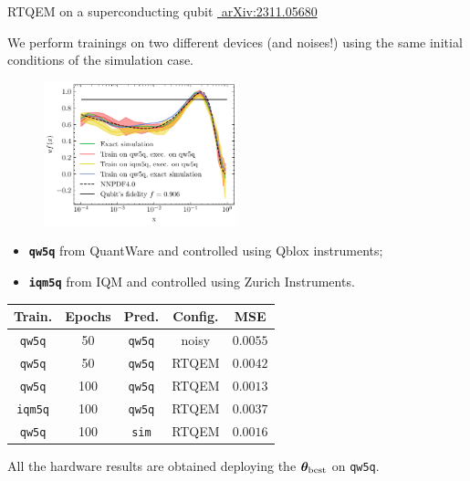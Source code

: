 \documentclass[8pt, xcolor={svgnames}, hyperref={linkcolor=black}]{beamer}
\begin{document}
\begin{frame}{RTQEM on a superconducting qubit \hfill \href{https://arxiv.org/abs/2311.05680}{\faBook\,\,arXiv:2311.05680}}

We perform trainings on two different devices (and noises!) using the same initial
conditions of the simulation case.
\pause
\begin{multicols}{2}

\begin{figure}
    \includegraphics[width=0.5\textwidth]{figures/100.pdf}%
\end{figure}
\pause
\begin{center}
\begin{itemize}[noitemsep]
  \item[\faCog] \textbf{\texttt{qw5q}} from QuantWare and controlled using Qblox instruments;
  \item[\faCog] \textbf{\texttt{iqm5q}} from IQM and controlled using Zurich Instruments.
\end{itemize}
\pause
\footnotesize
\begin{table}
\begin{tabular}{ccccc}
\hline \hline 
\textbf{Train.} & \textbf{Epochs} & \textbf{Pred.} &  \textbf{Config.} & MSE \\
\hline    
\texttt{qw5q} & 50 & \texttt{qw5q} & noisy & $0.0055$  \\     
\texttt{qw5q} & 50 & \texttt{qw5q} & RTQEM & $0.0042$ \\ 
\hline 
\texttt{qw5q} & 100 & \texttt{qw5q} & RTQEM & $0.0013$  \\     
\texttt{iqm5q} & 100 & \texttt{qw5q} & RTQEM & $0.0037$ \\   
\texttt{qw5q} & 100& \texttt{sim} & RTQEM & $0.0016$ \\   
\hline \hline
\end{tabular}
\centering
\end{table}
\end{center}
\end{multicols}
\pause
All the hardware results are obtained deploying the $\bm{\theta}_{\rm best}$ on 
\texttt{qw5q}.
\end{frame}
\end{document}
